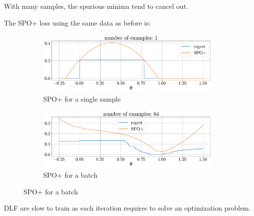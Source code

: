 \begin{description}
\begin{description}
                \begin{remark}
                    With many samples, the spurious minima tend to cancel out.
                \end{remark}

                \begin{example}
                    The SPO+ loss using the same data as before is:
                    \begin{figure}[H]
                        \centering
                        \begin{subfigure}{0.49\linewidth}
                            \centering
                            \includegraphics[width=\linewidth]{./img/_dfl_spop_example1.pdf}
                            \caption{SPO+ for a single sample}
                        \end{subfigure}
                        \begin{subfigure}{0.49\linewidth}
                            \centering
                            \includegraphics[width=\linewidth]{./img/_dfl_spop_example2.pdf}
                            \caption{SPO+ for a batch}
                        \end{subfigure}
                    \end{figure}
                \end{example}
        \end{description}

        \begin{remark}
            DLF are slow to train as each iteration requires to solve an optimization problem.
        \end{remark}


\end{description}
